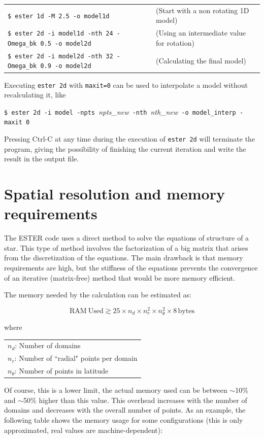 \medskip
\noindent\begin{tabular}{lp{4.5cm}}
\verb|$ ester 1d -M 2.5 -o model1d |  
&(Start with a non rotating 1D model)\\
\verb|$ ester 2d -i model1d -nth 24 -Omega_bk 0.5 -o model2d| &	
(Using an intermediate value for rotation) \\
\verb|$ ester 2d -i model2d -nth 32 -Omega_bk 0.9 -o model2d| &	
(Calculating the final model) 
\end{tabular}
\medskip

Executing {\tt ester 2d} with {\tt maxit=0} can be used to interpolate a
model without recalculating it, like

\medskip
\noindent
\verb|$ ester 2d -i model -npts |{\it npts\_new}\verb| -nth |{\it nth\_new}\verb| -o model_interp -maxit 0|

\medskip
Pressing Ctrl-C at any time during the execution of {\tt ester 2d} will
terminate the program, giving the possibility of finishing the current
iteration and write the result in the output file.

\section{Spatial resolution and memory requirements}

The ESTER code uses a direct method to solve the equations of structure
of a star. This type of method involves the factorization of a big matrix
that arises from the discretization of the equations.  The main drawback
is that memory requirements are high, but the stiffness of the equations
prevents the convergence of an iterative (matrix-free) method that would
be more memory efficient.

The memory needed by the calculation can be estimated as:

$$\mathrm{RAM\ Used}\gtrsim25\times n_d\times n_r^2 \times n_\theta^2 \times 8\, \mathrm{bytes}$$

where

\medskip

\begin{tabular}{l}
$n_d$: Number of domains \\
$n_r$: Number of ``radial" points per domain \\
$n_\theta$: Number of points in latitude \\
\end{tabular}

\medskip

Of course, this is a lower limit, the actual memory used can be between
$\sim$10\% and $\sim$50\% higher than this value.  This overhead
increases with the number of domains and decreases with the overall
number of points. As an example, the following table shows the memory
usage for some configurations (this is only approximated, real values
are machine-dependent):

